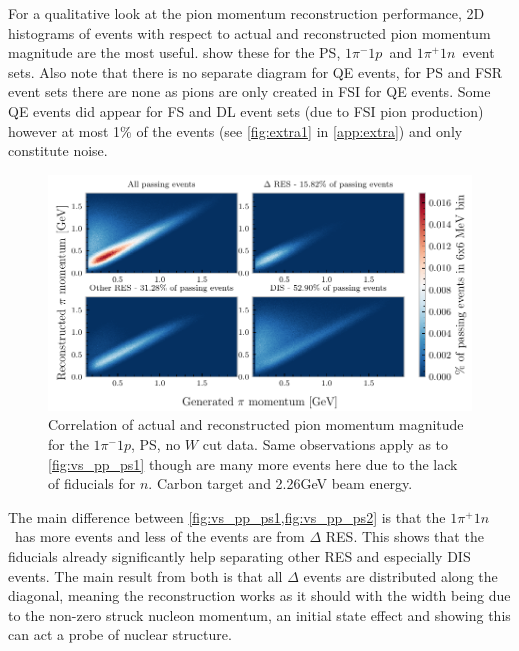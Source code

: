 \documentclass[a4paper,12pt]{article}
\newcommand{\md}{$1\pi^-1p$}
\newcommand{\pd}{$1\pi^+1n$}
\begin{document}
For a qualitative look at the pion momentum reconstruction performance, 2D histograms of events with respect to actual and reconstructed pion momentum magnitude are the most useful.
 show these for the PS, \md\ and \pd\ event sets.
Also note that there is no separate diagram for QE events, for PS and FSR event sets there are none as pions are only created in FSI for QE events.
Some QE events did appear for FS and DL event sets (due to FSI pion production) however at most 1\% of the events (see \cref{fig:extra1} in \cref{app:extra}) and only constitute noise.

\begin{figure}[H]
    \centering
    \includegraphics{figures/python/vs_pp_C_p_ps.pdf}
    \caption{
        Correlation of actual and reconstructed pion momentum magnitude for the \md, PS, no $W$ cut data.
        Same observations apply as to \cref{fig:vs_pp_ps1} though are many more events here due to the lack of fiducials for $n$.
        Carbon target and 2.26\si{GeV} beam energy.
    }\label{fig:vs_pp_ps2}
\end{figure}

The main difference between \cref{fig:vs_pp_ps1,fig:vs_pp_ps2} is that the \pd\ has more events and less of the events are from $\Delta$ RES.
This shows that the fiducials already significantly help separating other RES and especially DIS events.
The main result from both is that all $\Delta$ events are distributed along the diagonal, meaning the reconstruction works as it should with the width being due to the non-zero struck nucleon momentum\footnotemark, an initial state effect and showing this can act a probe of nuclear structure.
\end{document}
